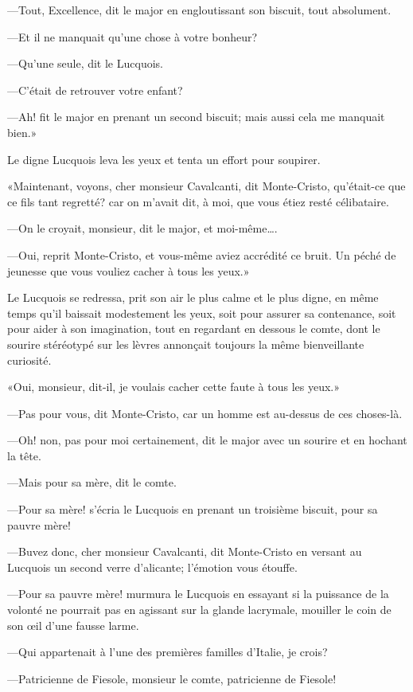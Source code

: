 —Tout, Excellence, dit le major en engloutissant son biscuit, tout absolument. 

—Et il ne manquait qu'une chose à votre bonheur? 

—Qu'une seule, dit le Lucquois. 

—C'était de retrouver votre enfant? 

—Ah! fit le major en prenant un second biscuit; mais aussi cela me manquait bien.» 

Le digne Lucquois leva les yeux et tenta un effort pour soupirer. 

«Maintenant, voyons, cher monsieur Cavalcanti, dit Monte-Cristo, qu'était-ce que ce fils tant regretté? car on m'avait dit, à moi, que vous étiez resté célibataire. 

—On le croyait, monsieur, dit le major, et moi-même\dots. 

—Oui, reprit Monte-Cristo, et vous-même aviez accrédité ce bruit. Un péché de jeunesse que vous vouliez cacher à tous les yeux.» 

Le Lucquois se redressa, prit son air le plus calme et le plus digne, en même temps qu'il baissait modestement les yeux, soit pour assurer sa contenance, soit pour aider à son imagination, tout en regardant en dessous le comte, dont le sourire stéréotypé sur les lèvres annonçait toujours la même bienveillante curiosité. 

«Oui, monsieur, dit-il, je voulais cacher cette faute à tous les yeux.» 

—Pas pour vous, dit Monte-Cristo, car un homme est au-dessus de ces choses-là. 

—Oh! non, pas pour moi certainement, dit le major avec un sourire et en hochant la tête. 

—Mais pour sa mère, dit le comte. 

—Pour sa mère! s'écria le Lucquois en prenant un troisième biscuit, pour sa pauvre mère! 

—Buvez donc, cher monsieur Cavalcanti, dit Monte-Cristo en versant au Lucquois un second verre d'alicante; l'émotion vous étouffe. 

—Pour sa pauvre mère! murmura le Lucquois en essayant si la puissance de la volonté ne pourrait pas en agissant sur la glande lacrymale, mouiller le coin de son œil d'une fausse larme. 

—Qui appartenait à l'une des premières familles d'Italie, je crois? 

—Patricienne de Fiesole, monsieur le comte, patricienne de Fiesole! 

